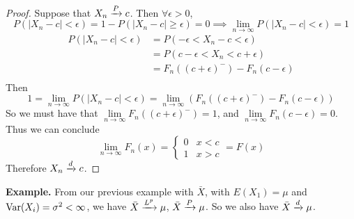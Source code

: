     \begin{proof}
        Suppose that $X_n \xrightarrow{P} c$. Then $\forall \epsilon > 0$,  
        \[P(|X_n - c| < \epsilon) = 1 - P(|X_n - c| \geq \epsilon) = 0 \implies \lim_{n\rightarrow\infty}P(|X_n - c| < \epsilon) = 1\]
        \begin{align*}
            P(|X_n-c| < \epsilon) &= P(- \epsilon < X_n - c < \epsilon)\\
            &= P(c - \epsilon < X_n < c + \epsilon)\\
            &= F_n((c + \epsilon)^-) - F_n(c-\epsilon)\\
        \end{align*}
        Then 
        \[1 = \lim_{n \rightarrow\infty}P(|X_n - c| < \epsilon) = \lim_{n\rightarrow \infty} \left(F_n((c+\epsilon)^-)  - F_n(c-\epsilon)\right)\]
        So we must have that $\lim\limits_{n\rightarrow \infty} F_n((c+\epsilon)^-) = 1$, and $\lim\limits_{n\rightarrow \infty} F_n(c-\epsilon) = 0$. Thus we can conclude
        \[\lim_{n\rightarrow\infty}F_n(x) = \begin{cases}
            0 & x < c\\
            1 & x > c
        \end{cases} = F(x)\]
        Therefore $X_n \xrightarrow{d} c$. 
    \end{proof}
    \textbf{Example.} From our previous example with $\bar{X}$, with $E(X_1) = \mu$ and $\operatorname{Var}(X_i) = \sigma^2 < \infty$, we have $\bar{X} \xrightarrow{L^{p}} \mu$, $\bar{X} \xrightarrow{P} \mu$. So we also have $\bar{X} \xrightarrow{d} \mu$.

